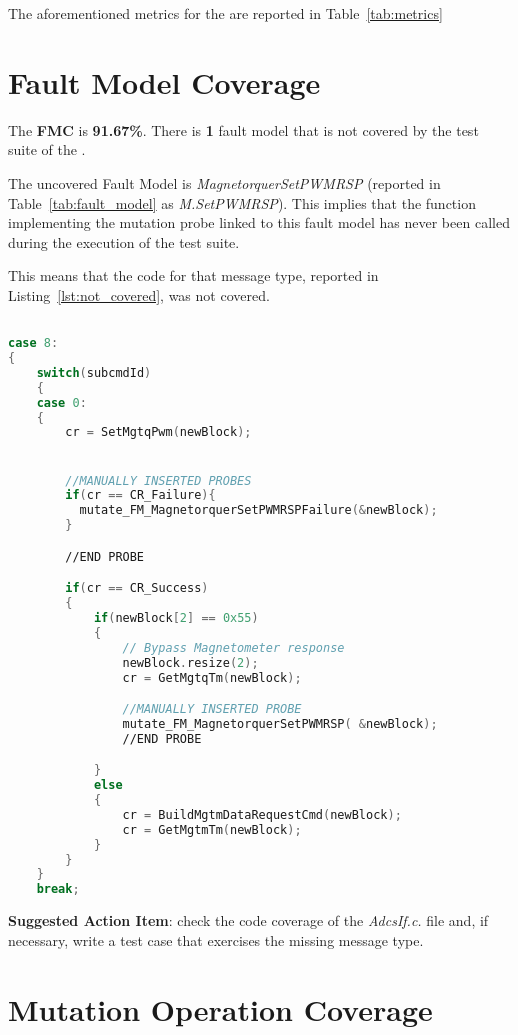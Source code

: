 The aforementioned metrics for the \case are reported in Table~\ref{tab:metrics}



\section{Fault Model Coverage}

The \textbf{FMC} is \textbf{91.67\%}. There is \textbf{1} fault model that is not covered by the test suite of the \case.

The uncovered Fault Model is \emph{MagnetorquerSetPWMRSP} (reported in Table~\ref{tab:fault_model} as \emph{M.SetPWMRSP}). This implies that the function implementing the mutation probe linked to this fault model has never been called during the execution of the test suite.

This means that the code for that message type, reported in Listing~\ref{lst:not_covered}, was not covered.


\begin{lstlisting}[language=C++, caption=Uncovered portion of source code, label={lst:not_covered}]

case 8:
{
    switch(subcmdId)
    {
    case 0:
    {
        cr = SetMgtqPwm(newBlock);


        //MANUALLY INSERTED PROBES
        if(cr == CR_Failure){
          mutate_FM_MagnetorquerSetPWMRSPFailure(&newBlock);
        }

        //END PROBE

        if(cr == CR_Success)
        {
            if(newBlock[2] == 0x55)
            {
                // Bypass Magnetometer response
                newBlock.resize(2);
                cr = GetMgtqTm(newBlock);

                //MANUALLY INSERTED PROBE
                mutate_FM_MagnetorquerSetPWMRSP( &newBlock);
                //END PROBE

            }
            else
            {
                cr = BuildMgtmDataRequestCmd(newBlock);
                cr = GetMgtmTm(newBlock);
            }
        }
    }
    break;


\end{lstlisting}


\textbf{Suggested Action Item}: check the code coverage of the \emph{AdcsIf.c.} file and, if necessary, write a test case that exercises the missing message type.

\section{Mutation Operation Coverage}


